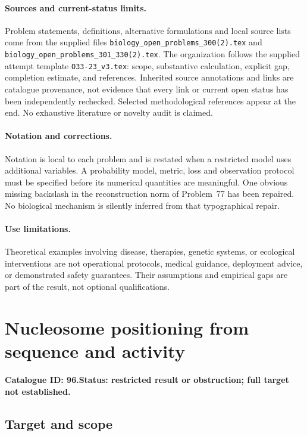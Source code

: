 \documentclass[11pt]{article}
\begin{document}
\paragraph{Sources and current-status limits.}
Problem statements, definitions, alternative formulations and local source lists
come from the supplied files
\texttt{biology\_open\_problems\_300(2).tex} and
\texttt{biology\_open\_problems\_301\_330(2).tex}.
The organization follows the supplied attempt template
\texttt{O33-23\_v3.tex}: scope, substantive calculation, explicit gap,
completion estimate, and references. Inherited source annotations and links are
catalogue provenance, not evidence that every link or current open status has
been independently rechecked. Selected methodological references appear at the
end. No exhaustive literature or novelty audit is claimed.

\paragraph{Notation and corrections.}
Notation is local to each problem and is restated when a restricted model uses
additional variables. A probability model, metric, loss and observation protocol
must be specified before its numerical quantities are meaningful. One obvious
missing backslash in the reconstruction norm of Problem~77 has been repaired.
No biological mechanism is silently inferred from that typographical repair.

\paragraph{Use limitations.}
Theoretical examples involving disease, therapies, genetic systems, or ecological
interventions are not operational protocols, medical guidance, deployment advice,
or demonstrated safety guarantees. Their assumptions and empirical gaps are part
of the result, not optional qualifications.

\setcounter{section}{95}
\section{Nucleosome positioning from sequence and activity}
\label{prob:096}
\noindent\textbf{Catalogue ID: 96.}\quad \textbf{Status: restricted result or obstruction; full target not established.}
\subsection{Target and scope}
\end{document}

